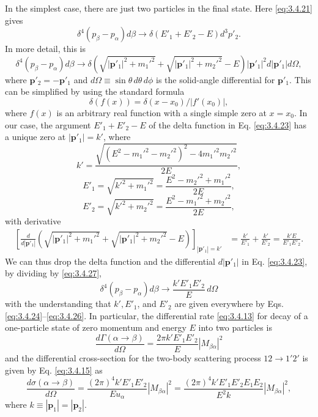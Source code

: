 In the simplest case, there are just two particles in the final state. Here \eqref{eq:3.4.21} gives
\[
 \delta^4(p_\beta-p_\alpha)d\beta\longrightarrow
 \delta(E'_1+E'_2-E)d^3p'_2.
\]
In more detail, this is
\begin{equation}
 \delta^4(p_\beta-p_\alpha)d\beta\longrightarrow
 \delta\left(\sqrt{|\mathbf{p}'_1|^2+m_1'^2}
 +\sqrt{|\mathbf{p}'_1|^2+m_2'^2}-E\right)
 |\mathbf{p}'_1|^2d|\mathbf{p}'_1|d\Omega,
 \tag{3.4.23}\label{eq:3.4.23}
\end{equation}
where $\mathbf{p}'_2=-\mathbf{p}'_1$ and $d\Omega\equiv\sin\theta\,d\theta\,d\phi$ is the
solid-angle differential for $\mathbf{p}'_1$. This can be simplified by using the standard formula
\[
 \delta(f(x))=\delta(x-x_0)/|f'(x_0)|,
\]
where $f(x)$ is an arbitrary real function with a single simple zero at $x=x_0$. In our case,
the argument $E'_1+E'_2-E$ of the delta function in Eq. \eqref{eq:3.4.23} has a unique zero at
$|\mathbf{p}'_1|=k'$, where
\begin{equation}
 k'=\frac{\sqrt{(E^2-m_1'^2-m_2'^2)^2-4m_1'^2m_2'^2}}{2E},
 \tag{3.4.24}\label{eq:3.4.24}
\end{equation}
\begin{equation}
 E'_1=\sqrt{k'^2+m_1'^2}=\frac{E^2-m_2'^2+m_1'^2}{2E},
 \tag{3.4.25}\label{eq:3.4.25}
\end{equation}
\begin{equation}
 E'_2=\sqrt{k'^2+m_2'^2}=\frac{E^2-m_1'^2+m_2'^2}{2E},
 \tag{3.4.26}\label{eq:3.4.26}
\end{equation}
with derivative
\begin{align}
 \left[\frac{d}{d|\mathbf{p}'_1|}
 \left(\sqrt{|\mathbf{p}'_1|^2+m_1'^2}
 +\sqrt{|\mathbf{p}'_1|^2+m_2'^2}-E\right)\right]_{|\mathbf{p}'_1|=k'}
 &=\frac{k'}{E'_1}+\frac{k'}{E'_2}=\frac{k'E}{E'_1E'_2}.
 \tag{3.4.27}\label{eq:3.4.27}
\end{align}
We can thus drop the delta function and the differential $d|\mathbf{p}'_1|$ in Eq. \eqref{eq:3.4.23},
by dividing by \eqref{eq:3.4.27},
\begin{equation}
 \delta^4(p_\beta-p_\alpha)d\beta\longrightarrow
 \frac{k'E'_1E'_2}{E}\,d\Omega
 \tag{3.4.28}\label{eq:3.4.28}
\end{equation}
with the understanding that $k',E'_1$, and $E'_2$ are given everywhere by Eqs. \eqref{eq:3.4.24}--\eqref{eq:3.4.26}.
In particular, the differential rate \eqref{eq:3.4.13} for decay of a one-particle state of zero momentum
and energy $E$ into two particles is
\begin{equation}
 \frac{d\Gamma(\alpha\to\beta)}{d\Omega}
 =\frac{2\pi k'E'_1E'_2}{E}|M_{\beta\alpha}|^2
 \tag{3.4.29}\label{eq:3.4.29}
\end{equation}
and the differential cross-section for the two-body scattering process $12\to1'2'$ is given by
Eq. \eqref{eq:3.4.15} as
\begin{equation}
 \frac{d\sigma(\alpha\to\beta)}{d\Omega}
 =\frac{(2\pi)^4k'E'_1E'_2}{Eu_\alpha}|M_{\beta\alpha}|^2
 =\frac{(2\pi)^4k'E'_1E'_2E_1E_2}{E^2k}|M_{\beta\alpha}|^2,
 \tag{3.4.30}\label{eq:3.4.30}
\end{equation}
where $k\equiv|\mathbf{p}_1|=|\mathbf{p}_2|$.

